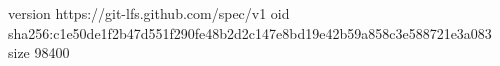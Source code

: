 version https://git-lfs.github.com/spec/v1
oid sha256:c1e50de1f2b47d551f290fe48b2d2c147e8bd19e42b59a858c3e588721e3a083
size 98400

